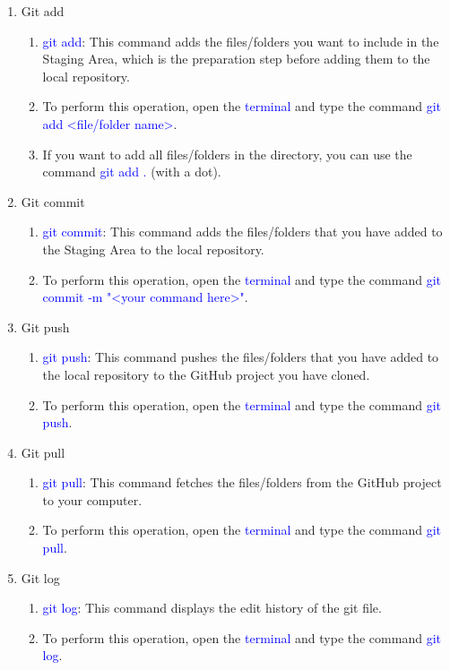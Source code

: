 \documentclass[12pt]{scrartcl}
\begin{document}
\begin{enumerate}
\item Git add

\begin{enumerate}
    \item \textcolor{blue}{git add}: This command adds the files/folders you want to include in the Staging Area, which is the preparation step before adding them to the local repository.
    \item To perform this operation, open the \textcolor{blue}{terminal} and type the command \textcolor{blue}{git add <file/folder name>}.
    \item If you want to add all files/folders in the directory, you can use the command \textcolor{blue}{git add .} (with a dot).
\end{enumerate}

\item Git commit

\begin{enumerate}
    \item \textcolor{blue}{git commit}: This command adds the files/folders that you have added to the Staging Area to the local repository.
    \item To perform this operation, open the \textcolor{blue}{terminal} and type the command \textcolor{blue}{git commit -m "<your command here>"}.
\end{enumerate}

\item Git push

\begin{enumerate}
    \item \textcolor{blue}{git push}: This command pushes the files/folders that you have added to the local repository to the GitHub project you have cloned.
    \item To perform this operation, open the \textcolor{blue}{terminal} and type the command \textcolor{blue}{git push}.
\end{enumerate}

\item Git pull

\begin{enumerate}
    \item \textcolor{blue}{git pull}: This command fetches the files/folders from the GitHub project to your computer.
    \item To perform this operation, open the \textcolor{blue}{terminal} and type the command \textcolor{blue}{git pull}.
\end{enumerate}

\item Git log

\begin{enumerate}
    \item \textcolor{blue}{git log}: This command displays the edit history of the git file.
    \item To perform this operation, open the \textcolor{blue}{terminal} and type the command \textcolor{blue}{git log}.
\end{enumerate}

\end{enumerate}
\newpage
\end{document}
